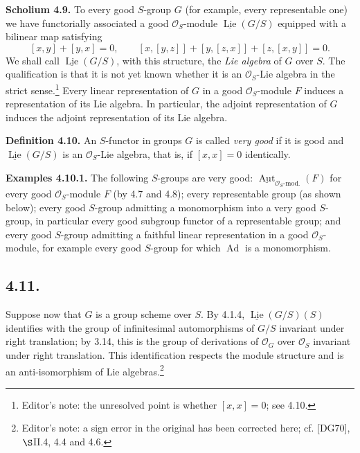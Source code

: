 \medskip
\noindent\textbf{Scholium 4.9.}
To every good \(S\)-group \(G\) (for example, every representable
one) we have functorially associated a good \(\mathcal O_S\)-module
\(\underline{\operatorname{Lie}}(G/S)\) equipped with a bilinear map
satisfying
\[
 [x,y]+[y,x]=0,
 \qquad
 [x,[y,z]]+[y,[z,x]]+[z,[x,y]]=0.
\]
We shall call \(\underline{\operatorname{Lie}}(G/S)\), with this
structure, the \emph{Lie algebra} of \(G\) over \(S\). The qualification
is that it is not yet known whether it is an
\(\mathcal O_S\)-Lie algebra in the strict sense.\footnote{Editor's
note: the unresolved point is whether \([x,x]=0\); see 4.10.}
Every linear representation of \(G\) in a good
\(\mathcal O_S\)-module \(F\) induces a representation of its Lie
algebra. In particular, the adjoint representation of \(G\) induces
the adjoint representation of its Lie algebra.

\medskip
\noindent\textbf{Definition 4.10.}
An \(S\)-functor in groups \(G\) is called \emph{very good} if it is
good and \(\underline{\operatorname{Lie}}(G/S)\) is an
\(\mathcal O_S\)-Lie algebra, that is, if \([x,x]=0\) identically.

\medskip
\noindent\textbf{Examples 4.10.1.}
The following \(S\)-groups are very good:
\(\underline{\operatorname{Aut}}_{\mathcal O_S\text{-mod.}}(F)\)
for every good \(\mathcal O_S\)-module \(F\) (by 4.7 and 4.8);
every representable group (as shown below); every good \(S\)-group
admitting a monomorphism into a very good \(S\)-group, in particular
every good subgroup functor of a representable group; and every good
\(S\)-group admitting a faithful linear representation in a good
\(\mathcal O_S\)-module, for example every good \(S\)-group for which
\(\operatorname{Ad}\) is a monomorphism.

\subsection*{4.11.}
Suppose now that \(G\) is a group scheme over \(S\). By 4.1.4,
\(\underline{\operatorname{Lie}}(G/S)(S)\) identifies with the group
of infinitesimal automorphisms of \(G/S\) invariant under right
translation; by 3.14, this is the group of derivations of
\(\mathcal O_G\) over \(\mathcal O_S\) invariant under right
translation. This identification respects the module structure and
is an anti-isomorphism of Lie algebras.\footnote{Editor's note: a sign
error in the original has been corrected here; cf. [DG70],
\(\S\)II.4, 4.4 and 4.6.}

